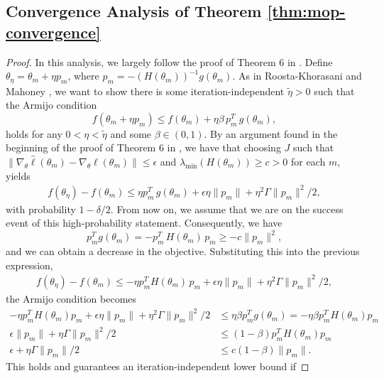 \subsection{Convergence Analysis of Theorem \ref{thm:mop-convergence}}

\begin{proof}
In this analysis, we largely follow the proof of Theorem 6 in \cite{mahoney16}.
Define $\theta_\eta = \theta_m + \eta p_m$, where $p_m=-(H(\theta_m))^{-1}g(\theta_m)$. 
As in Roosta-Khorasani and Mahoney \cite{mahoney16}, we want to show there is some iteration-independent $\tilde{\eta}>0$ such that the Armijo condition
\begin{equation}
    f(\theta_m+\eta p_m) \leq f(\theta_m) + \eta\beta \, p_m^T \, g(\theta_m),
\end{equation}
holds for any $0< \eta < \tilde{\eta}$ and some $\beta \in (0,1)$.
By an argument found in the beginning of the proof of Theorem 6 in \cite{mahoney16}, we have that choosing $J$ such that $\|\nabla_\theta\hat{\ell}(\theta_m) - \nabla_\theta \ell(\theta_m)\| \leq \epsilon$ and $\lambda_{\min}(H(\theta_m)) \geq c>0$ for each $m$, yields
\begin{align}
    f(\theta_\eta)-f(\theta_m) \leq \eta p_m^T\, g(\theta_m) + \epsilon\eta\|p_m\| + \eta^2 \Gamma \|p_m\|^2 / 2,
\end{align}
with probability $1-\delta/2$. 
From now on, we assume that we are on the success event of this high-probability statement. 
Consequently, we have
\begin{equation}
    p_m^Tg(\theta_m) = -p_m^T\, H(\theta_m)\, p_m \geq -c\|p_m\|^2,
\end{equation}
and we can obtain a decrease in the objective. 
Substituting this into the previous expression,
\begin{align}
    f(\theta_\eta)-f(\theta_m) \leq -\eta p_m^TH(\theta_m)\, p_m + \epsilon\eta\|p_m\| + \eta^2 \Gamma \|p_m\|^2 / 2,
\end{align}
the Armijo condition becomes
\begin{align}
    -\eta p_m^TH(\theta_m)p_m + \epsilon\eta\|p_m\| + \eta^2 \Gamma \|p_m\|^2 / 2 &\leq \eta \beta p_m^Tg(\theta_m) = - \eta \beta p_m^TH(\theta_m)p_m \\
    \epsilon\|p_m\| + \eta \Gamma \|p_m\|^2 / 2 &\leq (1- \beta) p_m^TH(\theta_m)p_m \\
    \epsilon + \eta \Gamma \|p_m\| / 2 &\leq c(1- \beta) \|p_m\|.
\end{align}
This holds and guarantees an iteration-independent lower bound if 

\end{proof}
